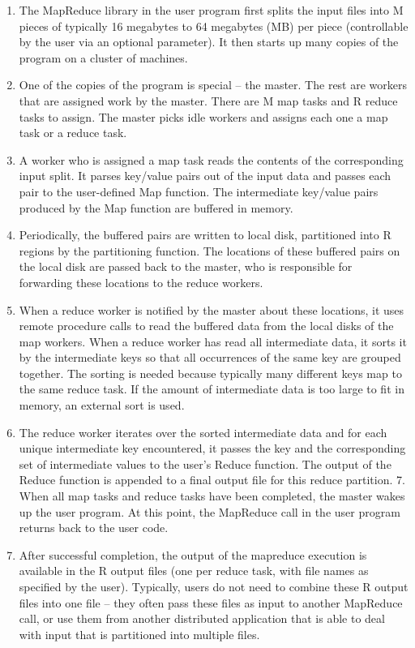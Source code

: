 \begin{enumerate}
\item The MapReduce library in the user program first
splits the input files into M pieces of typically 16
megabytes to 64 megabytes (MB) per piece (controllable
by the user via an optional parameter). It
then starts up many copies of the program on a cluster
of machines.
\item{One of the copies of the program is special – the
master. The rest are workers that are assigned work
by the master. There are M map tasks and R reduce
tasks to assign. The master picks idle workers and
assigns each one a map task or a reduce task.}
\item{A worker who is assigned a map task reads the
contents of the corresponding input split. It parses
key/value pairs out of the input data and passes each
pair to the user-defined Map function. The intermediate
key/value pairs produced by the Map function
are buffered in memory.}
\item{Periodically, the buffered pairs are written to local
disk, partitioned into R regions by the partitioning
function. The locations of these buffered pairs on
the local disk are passed back to the master, who
is responsible for forwarding these locations to the
reduce workers.}
\item{When a reduce worker is notified by the master
about these locations, it uses remote procedure calls
to read the buffered data from the local disks of the
map workers. When a reduce worker has read all intermediate
data, it sorts it by the intermediate keys
so that all occurrences of the same key are grouped
together. The sorting is needed because typically
many different keys map to the same reduce task. If
the amount of intermediate data is too large to fit in
memory, an external sort is used.}
\item{The reduce worker iterates over the sorted intermediate
data and for each unique intermediate key encountered,
it passes the key and the corresponding
set of intermediate values to the user's Reduce function.
The output of the Reduce function is appended
to a final output file for this reduce partition.
7. When all map tasks and reduce tasks have been
completed, the master wakes up the user program.
At this point, the MapReduce call in the user program
returns back to the user code.}
\item{After successful completion, the output of the mapreduce
execution is available in the R output files (one per
reduce task, with file names as specified by the user).
Typically, users do not need to combine these R output
files into one file – they often pass these files as input to
another MapReduce call, or use them from another distributed
application that is able to deal with input that is
partitioned into multiple files.}
\end{enumerate}


